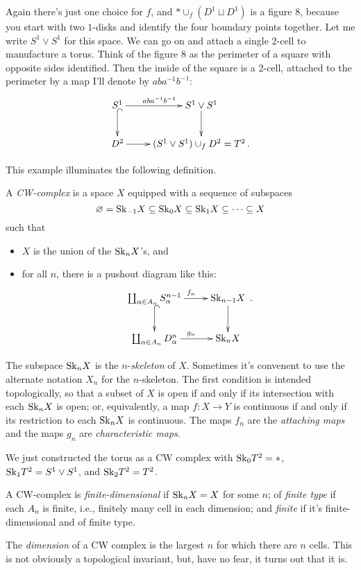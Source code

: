 Again there's just one choice for $f$, and 
$\ast\cup_f(D^1\sqcup D^1)$ is a figure $8$, because you start with 
two $1$-disks and identify the four boundary points together. Let me write 
$S^1\vee S^1$ for this space. We can go on and attach a single 2-cell to 
manufacture a torus. Think of the figure 8 as the perimeter of a square with opposite sides identified. Then the inside of the square is a 2-cell, attached to the perimeter by a map I'll denote by $aba^{-1}b^{-1}$: 
\begin{equation*}
\xymatrix{S^1\ar[r]^{aba^{-1}b^{-1}}\ar@{^(->}[d] & S^1\vee S^1\ar[d]\\
D^2\ar[r] & (S^1\vee S^1)\cup_f D^2=T^2\,.
}\end{equation*}

This example illuminates the following definition.

\begin{definition}
A \emph{CW-complex} is a space $X$ equipped with a sequence of subspaces 
\[
\varnothing=\mathrm{Sk}_{-1}X\subseteq\mathrm{Sk}_0X\subseteq\mathrm{Sk}_1X\subseteq\cdots\subseteq X
\]
such that 
\begin{itemize}
\item $X$ is the union of the $\mathrm{Sk}_nX$'s, and 
\item for all $n$, there is a pushout diagram like this:
\begin{equation*}
\xymatrix{\coprod_{\alpha\in A_n}S^{n-1}_\alpha\ar[r]^{f_n}\ar@{^(->}[d] 
& \Sk_{n-1}X\ar[d]\\
\coprod_{\alpha\in A_n}D^n_\alpha\ar[r]^{g_n} & \Sk_nX}\,.
\end{equation*}
\end{itemize}
\end{definition}
The subspace $\mathrm{Sk}_nX$ is the $n$-{\em skeleton} of $X$. 
Sometimes it's convenent to use the alternate notation $X_n$ 
for the $n$-skeleton.
The first condition is intended topologically, so that a subset of $X$ is open if and only if its intersection with each $\mathrm{Sk}_nX$ is open; or, equivalently, a map $f:X\to Y$ is continuous if and only if its restriction to each $\mathrm{Sk}_nX$ is continuous. The maps $f_n$ are the {\em attaching maps} and the maps $g_n$ are {\em characteristic maps}. 

\begin{example}
We just constructed the torus as a CW complex with $\mathrm{Sk}_0T^2=\ast$, $\mathrm{Sk}_1T^2=S^1\vee S^1$, and $\mathrm{Sk}_2T^2=T^2$.
\end{example}
\begin{definition}
A CW-complex is \emph{finite-dimensional} if $\mathrm{Sk}_nX=X$ for some $n$;
of \emph{finite type} if each $A_n$ is finite, i.e., finitely many cell in each dimension; and \emph{finite} if it's finite-dimensional and of finite type.
\end{definition}
The {\em dimension} of a CW complex is the largest $n$ for which there are 
$n$ cells. This is not obviously a topological invariant, but, have no fear,
it turns out that it is.

